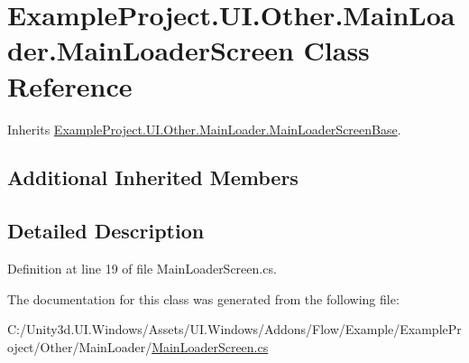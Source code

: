 \hypertarget{class_example_project_1_1_u_i_1_1_other_1_1_main_loader_1_1_main_loader_screen}{}\section{Example\+Project.\+U\+I.\+Other.\+Main\+Loader.\+Main\+Loader\+Screen Class Reference}
\label{class_example_project_1_1_u_i_1_1_other_1_1_main_loader_1_1_main_loader_screen}


Inherits \hyperlink{class_example_project_1_1_u_i_1_1_other_1_1_main_loader_1_1_main_loader_screen_base}{Example\+Project.\+U\+I.\+Other.\+Main\+Loader.\+Main\+Loader\+Screen\+Base}.

\subsection*{Additional Inherited Members}


\subsection{Detailed Description}


Definition at line 19 of file Main\+Loader\+Screen.\+cs.



The documentation for this class was generated from the following file\+:\begin{DoxyCompactItemize}
\item 
C\+:/\+Unity3d.\+U\+I.\+Windows/\+Assets/\+U\+I.\+Windows/\+Addons/\+Flow/\+Example/\+Example\+Project/\+Other/\+Main\+Loader/\hyperlink{_main_loader_screen_8cs}{Main\+Loader\+Screen.\+cs}\end{DoxyCompactItemize}
